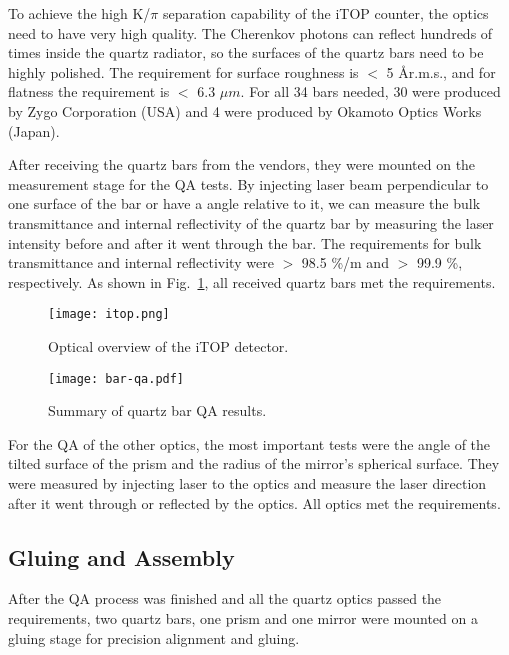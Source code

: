 \documentclass{llncs}
\begin{document}
To achieve the high K/$\pi$ separation capability of the iTOP counter,
the optics need to have very high quality. The Cherenkov photons can
reflect hundreds of times inside the quartz radiator, so the surfaces
of the quartz bars need to be highly polished. The requirement for
surface roughness is $<$ 5 \AA r.m.s., and for flatness the
requirement is $<$ 6.3 $\mu m$. For all 34 bars needed, 30 were
produced by Zygo Corporation (USA) and 4 were produced by Okamoto
Optics Works (Japan).

After receiving the quartz bars from the vendors, they were mounted on
the measurement stage for the QA tests. By injecting laser beam
perpendicular to one surface of the bar or have a angle relative to
it, we can measure the bulk transmittance and internal reflectivity of
the quartz bar by measuring the laser intensity before and after it
went through the bar. The requirements for bulk transmittance and
internal reflectivity were $>$ 98.5 \%/m and $>$ 99.9 \%,
respectively. As shown in Fig.~\ref{fig:bar-qa}, all received quartz
bars met the requirements.

\begin{figure}
  \centering
  \begin{minipage}{0.45\linewidth}
    \texttt{[image: itop.png]}
    \caption{Optical overview of the iTOP detector.}
    \label{fig:itop}
  \end{minipage}
  \begin{minipage}{0.45\linewidth}
    \texttt{[image: bar-qa.pdf]}
    \caption{Summary of quartz bar QA results.}
    \label{fig:bar-qa}
  \end{minipage}
\end{figure}

For the QA of the other optics, the most important tests were the
angle of the tilted surface of the prism and the radius of the
mirror's spherical surface. They were measured by injecting laser to
the optics and measure the laser direction after it went through or
reflected by the optics. All optics met the requirements.

\subsection{Gluing and Assembly}

After the QA process was finished and all the quartz optics passed the
requirements, two quartz bars, one prism and one mirror were mounted
on a gluing stage for precision alignment and gluing.
\end{document}
